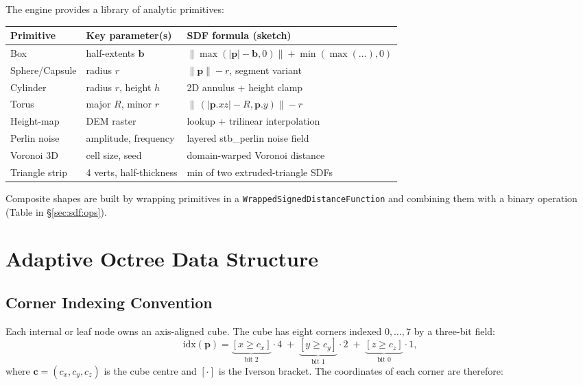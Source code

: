 \documentclass[10pt,a4paper]{article}
\begin{document}
The engine provides a library of analytic primitives:

\begin{center}
\begin{tabular}{lll}
  \toprule
  Primitive & Key parameter(s) & SDF formula (sketch)\\
  \midrule
  Box          & half-extents $\mathbf{b}$ & $\|\max(|\mathbf{p}|-\mathbf{b},0)\| + \min(\max(\ldots),0)$\\
  Sphere/Capsule & radius $r$            & $\|\mathbf{p}\| - r$, segment variant\\
  Cylinder     & radius $r$, height $h$  & 2D annulus + height clamp\\
  Torus        & major $R$, minor $r$    & $\|\,(|\mathbf{p}.xz|-R,\mathbf{p}.y)\| - r$\\
  Height-map   & DEM raster              & lookup + trilinear interpolation\\
  Perlin noise & amplitude, frequency    & layered stb\_perlin noise field\\
  Voronoi 3D   & cell size, seed         & domain-warped Voronoi distance\\
  Triangle strip& 4 verts, half-thickness& min of two extruded-triangle SDFs\\
  \bottomrule
\end{tabular}
\end{center}

Composite shapes are built by wrapping primitives in a
\lstinline{WrappedSignedDistanceFunction} and combining them with a
binary operation (Table in \S\ref{sec:sdf:ops}).

\section{Adaptive Octree Data Structure}
\label{sec:octree}

\subsection{Corner Indexing Convention}
\label{sec:octree:corners}

Each internal or leaf node owns an axis-aligned cube.  The cube has eight
corners indexed $0,\ldots,7$ by a three-bit field:
\begin{equation}
  \label{eq:corner_index}
  \text{idx}(\mathbf{p}) =
    \underbrace{[x \geq c_x]}_{\text{bit 2}} \cdot 4 \;+\;
    \underbrace{[y \geq c_y]}_{\text{bit 1}} \cdot 2 \;+\;
    \underbrace{[z \geq c_z]}_{\text{bit 0}} \cdot 1,
\end{equation}
where $\mathbf{c} = (c_x,c_y,c_z)$ is the cube centre and $[\cdot]$
is the Iverson bracket.  The coordinates of each corner are therefore:
\end{document}
